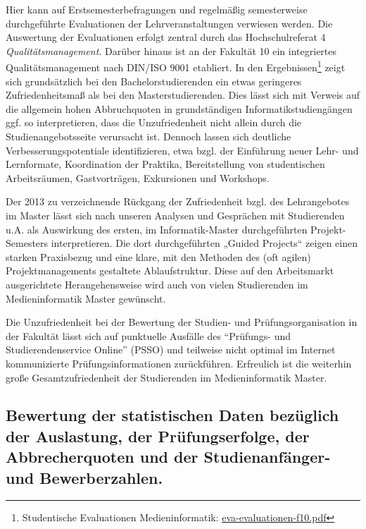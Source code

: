 Hier kann auf Erstsemesterbefragungen und regelmäßig semesterweise
durchgeführte Evaluationen der Lehrveranstaltungen verwiesen werden. Die
Auswertung der Evaluationen erfolgt zentral durch das Hochschulreferat 4
\emph{Qualitätsmanagement}. Darüber hinaus ist an der Fakultät 10 ein
integriertes Qualitätsmanagement nach DIN/ISO 9001 etabliert. In den
Ergebnissen\footnote{Studentische Evaluationen Medieninformatik:
  \href{https://th-koeln.github.io/mi-2017/anhaenge/eva-evaluationen-f10.pdf}{eva-evaluationen-f10.pdf}}
zeigt sich grundsätzlich bei den Bachelorstudierenden ein etwas
geringeres Zufriedenheitsmaß als bei den Masterstudierenden. Dies lässt
sich mit Verweis auf die allgemein hohen Abbruchquoten in grundständigen
Informatikstudiengängen ggf. so interpretieren, dass die Unzufriedenheit
nicht allein durch die Studienangebotsseite verursacht ist. Dennoch
lassen sich deutliche Verbesserungspotentiale identifizieren, etwa bzgl.
der Einführung neuer Lehr- und Lernformate, Koordination der Praktika,
Bereitstellung von studentischen Arbeitsräumen, Gastvorträgen,
Exkursionen und Workshops.

Der 2013 zu verzeichnende Rückgang der Zufriedenheit bzgl. des
Lehrangebotes im Master lässt sich nach unseren Analysen und Gesprächen
mit Studierenden u.A. als Auswirkung des ersten, im Informatik-Master
durchgeführten Projekt-Semesters interpretieren. Die dort durchgeführten
„Guided Projects`` zeigen einen starken Praxisbezug und eine klare, mit
den Methoden des (oft agilen) Projektmanagements gestaltete
Ablaufstruktur. Diese auf den Arbeitsmarkt ausgerichtete
Herangehensweise wird auch von vielen Studierenden im Medieninformatik
Master gewünscht.

Die Unzufriedenheit bei der Bewertung der Studien- und
Prüfungsorganisation in der Fakultät lässt sich auf punktuelle Ausfälle
des ``Prüfungs- und Studierendenservice Online'' (PSSO) und teilweise
nicht optimal im Internet kommunizierte Prüfungsinformationen
zurückführen. Erfreulich ist die weiterhin große Gesamtzufriedenheit der
Studierenden im Medieninformatik Master.

\subsection{Bewertung der statistischen Daten bezüglich der
Auslastung, der Prüfungserfolge, der Abbrecherquoten und der
Studienanfänger- und
Bewerberzahlen.}\label{bewertung-der-statistischen-daten-bezuxfcglich-der-auslastung-der-pruxfcfungserfolge-der-abbrecherquoten-und-der-studienanfuxe4nger--und-bewerberzahlen.}

